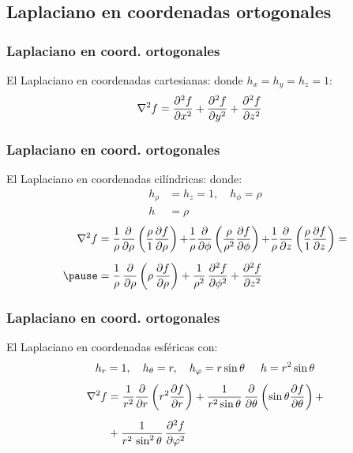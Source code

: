 \documentclass[12pt]{beamer}
\begin{document}
\subsection{Laplaciano en coordenadas ortogonales}

\begin{frame}
\frametitle{Laplaciano en coord. ortogonales}
El Laplaciano en coordenadas cartesianas:
\pause
donde $h_{x} = h_{y} = h_{z} = 1$:
\begin{align*}
\laplacian{f} &= \pdv[2]{f}{x} + \pdv[2]{f}{y} + \pdv[2]{f}{z}
\end{align*}
\end{frame}
\begin{frame}
\frametitle{Laplaciano en coord. ortogonales}
El Laplaciano en coordenadas cilíndricas:
\pause
donde:
\begin{align*}
h_{\rho} &= h_{z} = 1, \quad h_{\phi} = \rho \\
h &= \rho
\end{align*}
\pause
\vspace*{-0.5cm}
\begin{eqnarray*}
\begin{aligned}
\laplacian{f} &= \dfrac{1}{\rho} \pdv{\rho} \left( \dfrac{\rho}{1} \pdv{f}{\rho} \right) {+} \dfrac{1}{\rho} \pdv{\phi} \left( \dfrac{\rho}{\rho^{2}} \pdv{f}{\phi} \right) {+} \dfrac{1}{\rho} \pdv{z} \left( \dfrac{\rho}{1} \pdv{f}{z} \right) = \\[0.5em] \pause
&= \dfrac{1}{\rho} \, \pdv{\rho} \left( \rho \, \pdv{f}{\rho} \right) + \dfrac{1}{\rho^{2}} \, \pdv[2]{f}{\phi} + \pdv[2]{f}{z} 
\end{aligned}
\end{eqnarray*}
\end{frame}
\begin{frame}
\frametitle{Laplaciano en coord. ortogonales}
El Laplaciano en coordenadas esféricas con:
\begin{align*}
h_{r} = 1, \quad h_{\theta} = r, \quad h_{\varphi} = r \sin \theta \hspace{0.5cm} h = r^{2} \sin \theta
\end{align*}
\pause
\vspace*{-0.5cm}
\begin{align*}    
\laplacian{f} &= \dfrac{1}{r^{2}} \pdv{r} \left( r^{2} \pdv{f}{r} \right) + \dfrac{1}{r^{2} \sin \theta} \, \pdv{\theta} \left( \sin \theta \pdv{f}{\theta} \right) + \\[0.5em]
&+ \dfrac{1}{r^{2} \, \sin^{2} \theta} \, \pdv[2]{f}{\varphi}
\end{align*}
\end{frame}
\end{document}
